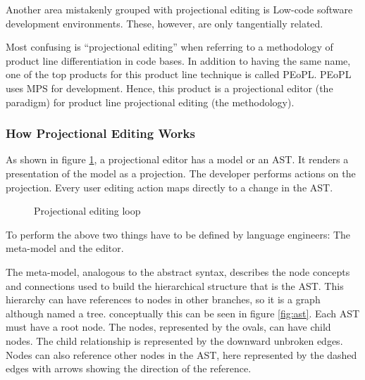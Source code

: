 Another area mistakenly grouped with projectional editing is Low-code software development environments.
These, however, are only tangentially related.

Most confusing is ``projectional editing'' when referring to a methodology of product line differentiation in code bases.
In addition to having the same name, one of the top products for this product line technique is called PEoPL.
PEoPL uses MPS for development.
Hence, this product is a projectional editor (the paradigm) for product line projectional editing (the methodology).

\subsubsection{How Projectional Editing Works}

As shown in figure \ref{fig:projectionalEditing_loop}, a projectional editor has a model or an AST.
It renders a presentation of the model as a projection.
The developer performs actions on the projection.
Every user editing action maps directly to a change in the AST.

\begin{figure}[h]
    \centering
    \caption{Projectional editing loop}
    \label{fig:projectionalEditing_loop}
\end{figure}

To perform the above two things have to be defined by language engineers: The meta-model and the editor.

The meta-model, analogous to the abstract syntax, describes the node concepts and connections used to build the hierarchical structure that is the AST.
This hierarchy can have references to nodes in other branches, so it is a graph although named a tree. 
conceptually this can be seen in figure \ref{fig:ast}.
Each AST must have a root node. 
The nodes, represented by the ovals, can have child nodes.
The child relationship is represented by the downward unbroken edges.
Nodes can also reference other nodes in the AST, here represented by the dashed edges with arrows showing the direction of the reference.

